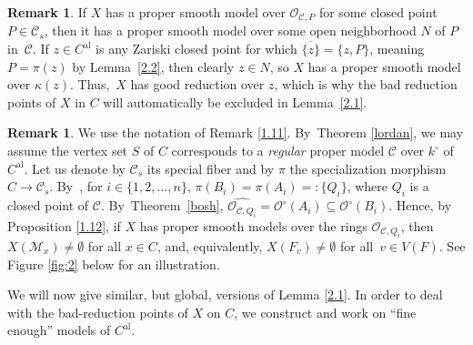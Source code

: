 \documentclass[JEP,XML,SOM,Unicode,NoFloatCountersInSection,published]{cedram}
\newcommand{\al}{\mathrm{al}}
\theoremstyle{definition}
\newtheorem{rem}[thm]{Remark}
\begin{document}
\begin{rem} \label{2.3}
If $X$ has a proper smooth model over $\mathcal{O}_{\mathcal{C}, P}$ for some closed point ${P \in \mathcal{C}_s}$, then it has a proper smooth model over some open neighborhood $N$ of $P$ in~$\mathcal{C}$. If $z \in C^{\al}$ is any Zariski closed point for which $\overline{\{z\}}=\{z, P\}$, meaning $P=\pi(z)$ by Lemma~\ref{2.2}, then clearly $z \in N$, so $X$ has a proper smooth model over $\kappa(z)$. Thus,~$X$ has good reduction over $z$, which is why the bad reduction points of $X$ in $C$ will automatically be excluded in Lemma~\ref{2.1}.
\end{rem}

\begin{rem} \label{ecuditshme}
We use the notation of Remark \ref{1.11}. By~Theorem \ref{lordan}, we may assume the vertex set $S$ of $C$ corresponds to a \emph{regular} proper model $\mathscr{C}$ over $k^{\circ}$ of $C^{\al}$. Let us denote by $\mathscr{C}_s$ its special fiber and by $\pi$ the specialization morphism $C \to \mathscr{C}_s$. By~\loccit, for $i \in \{1,2,\dots, n\}$, ${\pi(B_i)=\pi(A_i)=:\{Q_i\}}$, where $Q_i$ is a closed point of $\mathscr{C}$. By~Theorem~\ref{bosh}, $\widehat{\mathcal{O}_{\mathscr{C}, Q_i}}=\mathcal{O}^{\circ}(A_i) \subseteq \mathcal{O}^{\circ}(B_i)$. Hence, by Proposition \ref{1.12}, if $X$ has proper smooth models over the rings $\mathcal{O}_{\mathscr{C}, Q_i}$, then $X(\mathscr{M}_x) \neq \emptyset$ for all $x \in C$, and, equivalently, $X(F_v) \neq \emptyset$ for all~${v \in V(F)}$. See Figure \ref{fig:2} below for an illustration.
\end{rem}

We will now give similar, but global, versions of Lemma \ref{2.1}. In order to deal with the bad-reduction points of $X$ on $C$, we construct and work on ``fine enough'' models of $C^{\al}$.
\end{document}
